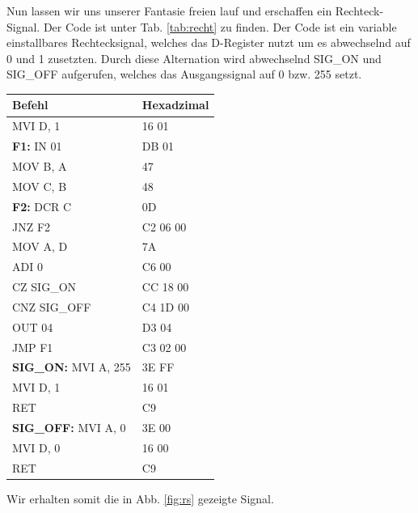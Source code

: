 \documentclass[10pt]{article}
\begin{document}
\begin{multicols}{2}
Nun lassen wir uns unserer Fantasie freien lauf und erschaffen ein Rechteck-Signal. Der Code ist unter Tab. \ref{tab:recht} zu finden. Der Code ist ein variable einstallbares Rechtecksignal, welches das D-Register nutzt um es abwechselnd auf 0 und 1 zusetzten. Durch diese Alternation wird abwechselnd SIG\_ON und SIG\_OFF aufgerufen, welches das Ausgangssignal auf 0 bzw. 255 setzt.
	\begin{center}
		\begin{tabular}{|l|l|}
			\hline
			\textbf{Befehl}              & \textbf{Hexadzimal} \\
			\hline
			MVI D, 1                     & 16 01               \\
			\textbf{F1:} IN 01           & DB 01               \\
			MOV B, A                     & 47                  \\
			MOV C, B                     & 48                  \\
			\textbf{F2:} DCR C           & 0D                  \\
			JNZ F2                       & C2 06 00            \\
			MOV A, D                     & 7A                  \\
			ADI 0                        & C6 00               \\
			CZ SIG\_ON                   & CC 18 00            \\
			CNZ SIG\_OFF                 & C4 1D 00            \\
			OUT 04                       & D3 04               \\
			JMP F1                       & C3 02 00            \\
			\textbf{SIG\_ON:} MVI A, 255 & 3E FF               \\
			MVI D, 1                     & 16 01               \\
			RET                          & C9                  \\
			\textbf{SIG\_OFF:} MVI A, 0  & 3E 00               \\
			MVI D, 0                     & 16 00               \\
			RET                          & C9                  \\
			\hline
		\end{tabular}
    \label{tab:recht}
	\end{center}
  Wir erhalten somit die in Abb. \ref{fig:rs} gezeigte Signal.

\end{multicols}
\end{document}
